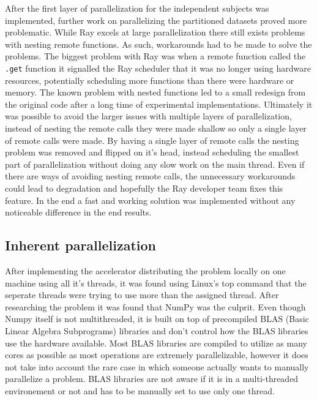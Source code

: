\documentclass[12pt, a4paper]{article}
\begin{document}
After the first layer of parallelization for the independent subjects was implemented, further work on parallelizing the partitioned datasets proved more problematic.
While Ray excels at large parallelization there still exists problems with nesting remote functions. As such, workarounds had to be made to solve the problems.
The biggest problem with Ray was when a remote function called the \texttt{.get} function it signalled the Ray scheduler that it was no longer using hardware resources, potentially scheduling more functions than there were hardware or memory.
The known problem with nested functions led to a small redesign from the original code after a long time of experimental implementations. 
Ultimately it was possible to avoid the larger issues with multiple layers of parallelization, instead of nesting the remote calls they were made shallow so only a single layer of remote calls were made.
By having a single layer of remote calls the nesting problem was removed and flipped on it's head, instead scheduling the smallest part of parallelization without doing any slow work on the main thread. 
Even if there are ways of avoiding nesting remote calls, the unnecessary workarounds could lead to degradation and hopefully the Ray developer team fixes this feature. 
In the end a fast and working solution was implemented without any noticeable difference in the end results.


\subsection{Inherent parallelization}

After implementing the accelerator distributing the problem locally on one machine using all it's threads, it was found using Linux's top command that the seperate threads were trying to use more than the assigned thread.
After researching the problem it was found that NumPy was the culprit.
Even though Numpy itself is not multithreaded, it is built on top of precompiled BLAS (Basic Linear Algebra Subprograms) libraries and don't control how the BLAS libraries use the hardware available.
Most BLAS libraries are compiled to utilize as many cores as possible as most operations are extremely parallelizable, however it does not take into account the rare case in which someone actually wants to manually parallelize a problem. 
BLAS libraries are not aware if it is in a multi-threaded environement or not and has to be manually set to use only one thread.
\end{document}
